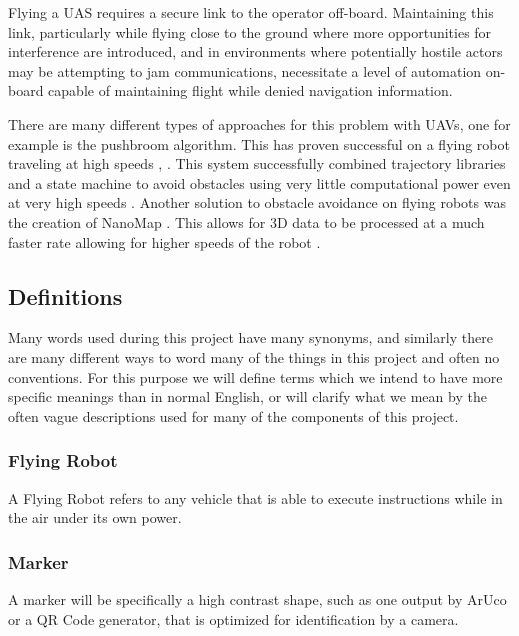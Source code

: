 \documentclass{article}
\begin{document}
		Flying a UAS requires a secure link to the operator off-board. Maintaining this link, particularly while flying close to the ground where more opportunities for interference are introduced, and in environments where potentially hostile actors may be attempting to jam communications, necessitate a level of automation on-board capable of maintaining flight while denied navigation information.
		
		There are many different types of approaches for this problem with UAVs, one for example is the pushbroom algorithm. This has proven successful on a flying robot traveling at high speeds \cite{barry2018high}, \cite{barry2015pushbroom}. This system successfully combined trajectory libraries and a state machine to avoid obstacles using very little computational power even at very high speeds \cite{barry2018high}. Another solution to obstacle avoidance on flying robots was the creation of NanoMap \cite{2018nanomap}. This allows for 3D data to be processed at a much faster rate allowing for higher speeds of the robot \cite{2018nanomap}.
		
	\subsection{Definitions}
	
	Many words used during this project have many synonyms, and similarly there are many different ways to word many of the things in this project and often no conventions. For this purpose we will define terms which we intend to have more specific meanings than in normal English, or will clarify what we mean by the often vague descriptions used for many of the components of this project.
	
		\subsubsection{Flying Robot}
		
		A Flying Robot refers to any vehicle that is able to execute instructions while in the air under its own power.
		
		\subsubsection{Marker}
		
		A marker will be specifically a high contrast shape, such as one output by ArUco or a QR Code generator, that is optimized for identification by a camera.
		
\end{document}
